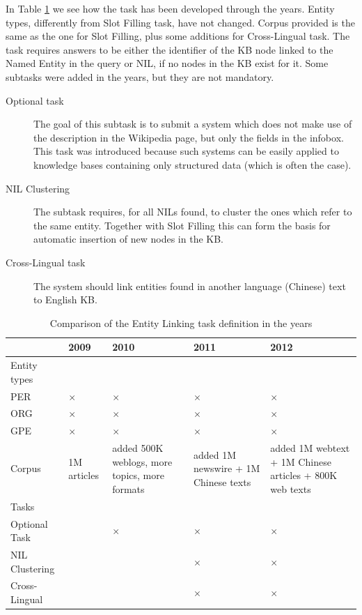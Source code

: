 \documentclass[a4paper,11pt]{report}
\newcommand{\tick}{$\times$}
\begin{document}
In Table \ref{tab:el} we see how the task has been developed through the years. Entity types, differently from Slot Filling task, have not changed. Corpus provided is the same as the one for Slot Filling, plus some additions for Cross-Lingual task. The task requires answers to be either the identifier of the KB node linked to the Named Entity in the query or NIL, if no nodes in the KB exist for it.
Some subtasks were added in the years, but they are not mandatory.
\begin{description}
\item[Optional task] The goal of this subtask is to submit a system which does not make use of the description in the Wikipedia page, but only the fields in the infobox. This task was introduced because such systems can be easily applied to knowledge bases containing only structured data (which is often the case).
\item[NIL Clustering] The subtask requires, for all NILs found, to cluster the ones which refer to the same entity. Together with Slot Filling this can form the basis for automatic insertion of new nodes in the KB.
\item[Cross-Lingual task] The system should link entities found in another language (Chinese) text to English KB.
\end{description}

\begin{table}
\begin{tabularx}{\linewidth}{lXXXX}
 & 2009 & 2010 & 2011 & 2012 \\
\hline Entity types \\ 
  PER & \tick & \tick & \tick & \tick \\
  ORG & \tick & \tick & \tick & \tick \\
  GPE & \tick & \tick & \tick & \tick \\
\hline Corpus & 1M articles & added 500K weblogs, more topics, more formats & added 1M newswire + 1M Chinese texts & added 1M webtext + 1M Chinese articles + 800K web texts\\
\hline Tasks\\ 
Optional Task & & \tick & \tick & \tick \\
NIL Clustering & & & \tick & \tick \\
Cross-Lingual  & & & \tick & \tick \\
 
 

\end{tabularx}

\caption{Comparison of the Entity Linking task definition in the years}
\label{tab:el}
\end{table}
\end{document}
